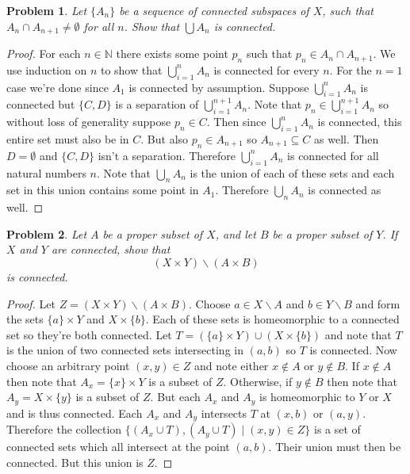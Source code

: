 \documentclass{article}
\newtheorem{problem}{Problem}
\begin{document}
\begin{problem}
Let $\{A_n\}$ be a sequence of connected subspaces of $X$, such that $A_n \cap A_{n+1} \neq \emptyset$ for all $n$. Show that $\bigcup A_n$ is connected.
\end{problem}
\begin{proof}
For each $n \in \mathbb{N}$ there exists some point $p_n$ such that $p_n \in A_n \cap A_{n+1}$. We use induction on $n$ to show that $\bigcup_{i=1}^n A_n$ is connected for every $n$. For the $n=1$ case we're done since $A_1$ is connected by assumption. Suppose $\bigcup_{i=1}^n A_n$ is connected but $\{C,D\}$ is a separation of $\bigcup_{i=1}^{n+1} A_n$. Note that $p_n \in \bigcup_{i=1}^{n+1} A_n$ so without loss of generality suppose $p_n \in C$. Then since $\bigcup_{i=1}^n A_n$ is connected, this entire set must also be in $C$. But also $p_n \in A_{n+1}$ so $A_{n+1} \subseteq C$ as well. Then $D = \emptyset$ and $\{C,D\}$ isn't a separation. Therefore $\bigcup_{i=1}^n A_n$ is connected for all natural numbers $n$. Note that $\bigcup_n A_n$ is the union of each of these sets and each set in this union contains some point in $A_1$. Therefore $\bigcup_n A_n$ is connected as well.
\end{proof}

\begin{problem}
Let $A$ be a proper subset of $X$, and let $B$ be a proper subset of $Y$. If $X$ and $Y$ are connected, show that
\[
(X \times Y) \backslash (A \times B)
\]
is connected.
\end{problem}
\begin{proof}
Let $Z = (X \times Y) \backslash (A \times B)$. Choose $a \in X \backslash A$ and $b \in Y \backslash B$ and form the sets $\{a\} \times Y$ and $X \times \{b\}$. Each of these sets is homeomorphic to a connected set so they're both connected. Let $T = (\{a\} \times Y) \cup (X \times \{b\})$ and note that $T$ is the union of two connected sets intersecting in $(a,b)$ so $T$ is connected. Now choose an arbitrary point $(x,y) \in Z$ and note either $x \notin A$ or $y \notin B$. If $x \notin A$ then note that $A_x = \{x\} \times Y$ is a subset of $Z$. Otherwise, if $y \notin B$ then note that $A_y = X \times \{y\}$ is a subset of $Z$. But each $A_x$ and $A_y$ is homeomorphic to $Y$ or $X$ and is thus connected. Each $A_x$ and $A_y$ intersects $T$ at $(x,b)$ or $(a,y)$. Therefore the collection $\{(A_x \cup T), (A_y \cup T) \mid (x,y) \in Z\}$ is a set of connected sets which all intersect at the point $(a,b)$. Their union must then be connected. But this union is $Z$.
\end{proof}
\end{document}
